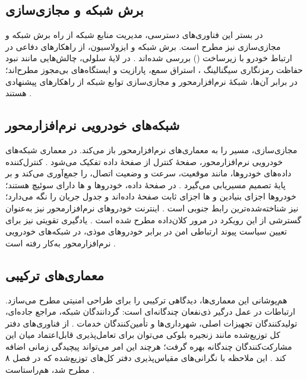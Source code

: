 \documentclass[12pt,a4paper]{article}
\begin{document}
\subsection{برش شبکه و مجازی‌سازی}
در بستر این فناوری‌های دسترسی، مدیریت منابع شبکه از راه برش شبکه و مجازی‌سازی نیز مطرح است. برش شبکه و ایزولاسیون، از راهکار‌های دفاعی در ارتباط خودرو با زیرساخت () بررسی شده‌اند \cite{farsimadanReviewSecurityChallenges2025}. در لایهٔ سلولی، چالش‌هایی مانند نبود حفاظت رمزنگاری سیگنالینگ ، استراق سمع، پارازیت و ایستگاه‌های بی‌مجوز مطرح‌اند؛ در برابر آن‌ها، شبکهٔ نرم‌افزارمحور و مجازی‌سازی توابع شبکه از راهکار‌های پیشنهادی هستند \cite{farsimadanReviewSecurityChallenges2025}.

\subsection{شبکه‌های خودرویی نرم‌افزارمحور}
مجازی‌سازی، مسیر را به معماری‌های نرم‌افزارمحور باز می‌کند. در معماری شبکه‌های خودرویی نرم‌افزارمحور، صفحهٔ کنترل از صفحهٔ داده تفکیک می‌شود \cite{hozouriOverviewVANETVehicular2023}. کنترل‌کننده داده‌های خودروها، مانند موقعیت، سرعت و وضعیت اتصال، را جمع‌آوری می‌کند و بر پایهٔ  تصمیم مسیریابی می‌گیرد \cite{hozouriOverviewVANETVehicular2023}. در صفحهٔ داده، خودرو‌ها و ها دارای سوئیچ  هستند؛ خودرو‌ها اجزای بنیادین و ها اجزای ثابت صفحهٔ داده‌اند و  جدول جریان  را نگه می‌دارد؛  نیز شناخته‌شده‌ترین رابط جنوبی است \cite{hozouriOverviewVANETVehicular2023}. اینترنت خودرو‌های نرم‌افزارمحور نیز به‌عنوان گسترشی از این رویکرد در مرور کلان‌داده مطرح شده است \cite{xuInternetVehiclesBig2018}. یادگیری تقویتی نیز برای تعیین سیاست پیوند ارتباطی امن در برابر خودرو‌های موذی، در شبکه‌های خودرویی نرم‌افزارمحور به‌کار رفته است \cite{farsimadanReviewSecurityChallenges2025}.

\subsection{معماری‌های ترکیبی}
هم‌پوشانی این معماری‌ها، دیدگاهی ترکیبی را برای طراحی امنیتی مطرح می‌سازد. ارتباطات  در عمل درگیر ذی‌نفعان چندگانه‌ای است: گردانندگان شبکه، مراجع جاده‌ای، تولیدکنندگان تجهیزات اصلی، شهرداری‌ها و تأمین‌کنندگان خدمات \cite{farsimadanReviewSecurityChallenges2025}. از فناوری‌های دفتر کل توزیع‌شده مانند زنجیره بلوکی می‌توان برای تعامل‌پذیری قابل‌اعتماد میان این مشارکت‌کنندگان چندگانه بهره گرفت؛ هرچند این امر می‌تواند پیچیدگی زمانی اضافه کند \cite{farsimadanReviewSecurityChallenges2025}. این ملاحظه با نگرانی‌های مقیاس‌پذیری دفتر کل‌های توزیع‌شده که در فصل ۸ مطرح شد، هم‌راستاست \cite{farsimadanReviewSecurityChallenges2025}.
\end{document}
